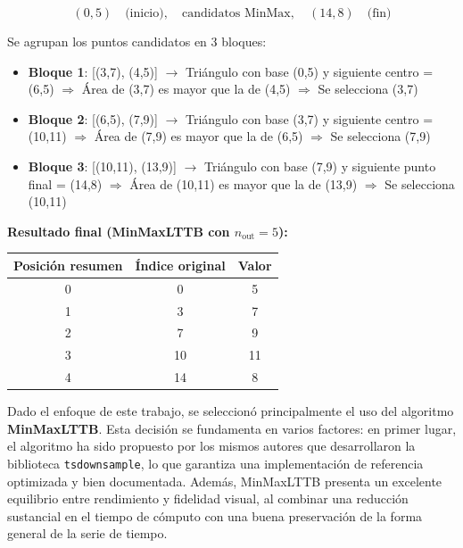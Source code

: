 \[
(0,5) \quad \text{(inicio)}, \quad \text{candidatos MinMax}, \quad (14,8) \quad \text{(fin)}
\]

Se agrupan los puntos candidatos en 3 bloques:

\begin{itemize}
    \item \textbf{Bloque 1}: [(3,7), (4,5)]  
    $\rightarrow$ Triángulo con base (0,5) y siguiente centro = (6,5)  
    $\Rightarrow$ Área de (3,7) es mayor que la de (4,5)  
    $\Rightarrow$ Se selecciona (3,7)

    \item \textbf{Bloque 2}: [(6,5), (7,9)]  
    $\rightarrow$ Triángulo con base (3,7) y siguiente centro = (10,11)  
    $\Rightarrow$ Área de (7,9) es mayor que la de (6,5)  
    $\Rightarrow$ Se selecciona (7,9)

    \item \textbf{Bloque 3}: [(10,11), (13,9)]  
    $\rightarrow$ Triángulo con base (7,9) y siguiente punto final = (14,8)  
    $\Rightarrow$ Área de (10,11) es mayor que la de (13,9)  
    $\Rightarrow$ Se selecciona (10,11)
\end{itemize}

\bigskip

\noindent \textbf{Resultado final (MinMaxLTTB con $n_{\text{out}} = 5$):}

\begin{center}
\begin{tabular}{|c|c|c|}
\hline
Posición resumen & Índice original & Valor \\
\hline
0 & 0 & 5 \\
1 & 3 & 7 \\
2 & 7 & 9 \\
3 & 10 & 11 \\
4 & 14 & 8 \\
\hline
\end{tabular}
\end{center}


Dado el enfoque de este trabajo, se seleccionó principalmente el uso del algoritmo \textbf{MinMaxLTTB}. Esta decisión se fundamenta en varios factores: en primer lugar, el algoritmo ha sido propuesto por los mismos autores que desarrollaron la biblioteca \texttt{tsdownsample}, lo que garantiza una implementación de referencia optimizada y bien documentada. Además, MinMaxLTTB presenta un excelente equilibrio entre rendimiento y fidelidad visual, al combinar una reducción sustancial en el tiempo de cómputo con una buena preservación de la forma general de la serie de tiempo.

